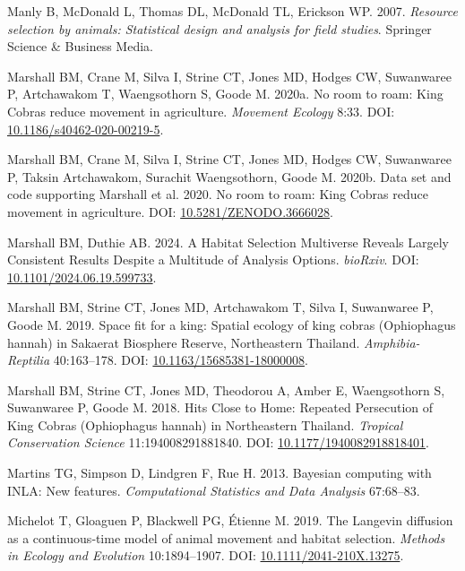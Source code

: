 \documentclass[10pt,a4paper]{article}
\newlength{\cslhangindent}
\newenvironment{CSLReferences}[2] %
 {\begin{list}{}{%
  \setlength{\itemindent}{0pt}
  \setlength{\leftmargin}{0pt}
  \setlength{\parsep}{0pt}
  \ifodd #1
   \setlength{\leftmargin}{\cslhangindent}
   \setlength{\itemindent}{-1\cslhangindent}
  \fi
  \setlength{\itemsep}{#2\baselineskip}}}
 {\end{list}}
\begin{document}
\begin{CSLReferences}{1}{0}
Manly B, McDonald L, Thomas DL, McDonald TL, Erickson WP. 2007. \emph{Resource selection by animals: Statistical design and analysis for field studies}. Springer Science \& Business Media.

Marshall BM, Crane M, Silva I, Strine CT, Jones MD, Hodges CW, Suwanwaree P, Artchawakom T, Waengsothorn S, Goode M. 2020a. No room to roam: {King} {Cobras} reduce movement in agriculture. \emph{Movement Ecology} 8:33. DOI: \href{https://doi.org/10.1186/s40462-020-00219-5}{10.1186/s40462-020-00219-5}.

Marshall BM, Crane M, Silva I, Strine CT, Jones MD, Hodges CW, Suwanwaree P, Taksin Artchawakom, Surachit Waengsothorn, Goode M. 2020b. Data set and code supporting {Marshall} et al. 2020. {No} room to roam: {King} {Cobras} reduce movement in agriculture. DOI: \href{https://doi.org/10.5281/ZENODO.3666028}{10.5281/ZENODO.3666028}.

Marshall BM, Duthie AB. 2024. A {Habitat} {Selection} {Multiverse} {Reveals} {Largely} {Consistent} {Results} {Despite} a {Multitude} of {Analysis} {Options}. \emph{bioRxiv}. DOI: \href{https://doi.org/10.1101/2024.06.19.599733}{10.1101/2024.06.19.599733}.

Marshall BM, Strine CT, Jones MD, Artchawakom T, Silva I, Suwanwaree P, Goode M. 2019. Space fit for a king: Spatial ecology of king cobras ({Ophiophagus} hannah) in {Sakaerat} {Biosphere} {Reserve}, {Northeastern} {Thailand}. \emph{Amphibia-Reptilia} 40:163--178. DOI: \href{https://doi.org/10.1163/15685381-18000008}{10.1163/15685381-18000008}.

Marshall BM, Strine CT, Jones MD, Theodorou A, Amber E, Waengsothorn S, Suwanwaree P, Goode M. 2018. Hits {Close} to {Home}: {Repeated} {Persecution} of {King} {Cobras} ({Ophiophagus} hannah) in {Northeastern} {Thailand}. \emph{Tropical Conservation Science} 11:194008291881840. DOI: \href{https://doi.org/10.1177/1940082918818401}{10.1177/1940082918818401}.

Martins TG, Simpson D, Lindgren F, Rue H. 2013. Bayesian computing with {INLA}: {N}ew features. \emph{Computational Statistics and Data Analysis} 67:68--83.

Michelot T, Gloaguen P, Blackwell PG, Étienne M. 2019. The {Langevin} diffusion as a continuous‐time model of animal movement and habitat selection. \emph{Methods in Ecology and Evolution} 10:1894--1907. DOI: \href{https://doi.org/10.1111/2041-210X.13275}{10.1111/2041-210X.13275}.


\end{CSLReferences}
\end{document}
